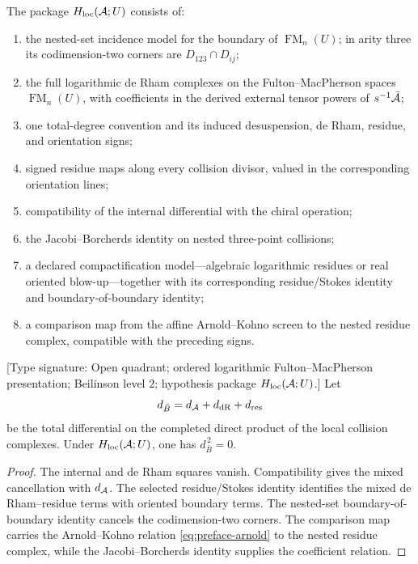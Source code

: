 \begin{definition}
\label{def:preface-local-collision-package}
The package \(H_{\mathrm{loc}}(\mathcal{A};U)\) consists of:
\begin{enumerate}[label=\textup{(\roman*)},leftmargin=*]
\item the nested-set incidence model for the boundary of
 \(\operatorname{FM}_n(U)\); in arity three its codimension-two
 corners are \(D_{123}\cap D_{ij}\);
\item the full logarithmic de Rham complexes on the
 Fulton--MacPherson spaces \(\operatorname{FM}_n(U)\), with
 coefficients in the derived external tensor powers of
 \(s^{-1}\bar{\mathcal{A}}\);
\item one total-degree convention and its induced desuspension,
 de Rham, residue, and orientation signs;
\item signed residue maps along every collision divisor, valued in
 the corresponding orientation lines;
\item compatibility of the internal differential with the chiral
 operation;
\item the Jacobi--Borcherds identity on nested three-point collisions;
\item a declared compactification model---algebraic logarithmic
 residues or real oriented blow-up---together with its corresponding
 residue/Stokes identity and boundary-of-boundary identity;
\item a comparison map from the affine Arnold--Kohno screen to the
 nested residue complex, compatible with the preceding signs.
\end{enumerate}
\end{definition}

\begin{proposition}
\label{prop:preface-local-square-zero}
\textup{[Type signature: Open quadrant; ordered logarithmic
Fulton--MacPherson presentation; Beilinson level \(2\); hypothesis
package \(H_{\mathrm{loc}}(\mathcal{A};U)\).]}
Let
\[
 d_{\bar B}=d_{\mathcal{A}}+d_{\mathrm{dR}}+d_{\mathrm{res}}
\]
be the total differential on the completed direct product of the
local collision complexes.  Under
\(H_{\mathrm{loc}}(\mathcal{A};U)\), one has \(d_{\bar B}^{\,2}=0\).
\end{proposition}

\begin{proof}
The internal and de Rham squares vanish.  Compatibility gives the
mixed cancellation with \(d_{\mathcal{A}}\).  The selected residue/Stokes
identity identifies the mixed de Rham--residue terms with oriented
boundary terms.  The nested-set boundary-of-boundary identity cancels
the codimension-two corners.  The comparison map carries the
Arnold--Kohno relation
\eqref{eq:preface-arnold} to the nested residue complex, while the
Jacobi--Borcherds identity supplies the coefficient relation.
\end{proof}

